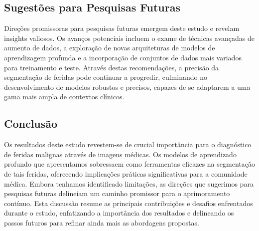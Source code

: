 \subsection{Sugestões para Pesquisas Futuras}

Direções promissoras para pesquisas futuras emergem deste estudo e revelam insights valiosos. Os avanços potenciais incluem o exame de técnicas avançadas de aumento de dados, a exploração de novas arquiteturas de modelos de aprendizagem profunda e a incorporação de conjuntos de dados mais variados para treinamento e teste. Através destas recomendações, a precisão da segmentação de feridas pode continuar a progredir, culminando no desenvolvimento de modelos robustos e precisos, capazes de se adaptarem a uma gama mais ampla de contextos clínicos.


\subsection{Conclusão}

Os resultados deste estudo revestem-se de crucial importância para o diagnóstico de feridas malignas através de imagens médicas. Os modelos de aprendizado profundo que apresentamos sobressaem como ferramentas eficazes na segmentação de tais feridas, oferecendo implicações práticas significativas para a comunidade médica. Embora tenhamos identificado limitações, as direções que sugerimos para pesquisas futuras delineiam um caminho promissor para o aprimoramento contínuo. Esta discussão resume as principais contribuições e desafios enfrentados durante o estudo, enfatizando a importância dos resultados e delineando os passos futuros para refinar ainda mais as abordagens propostas.

